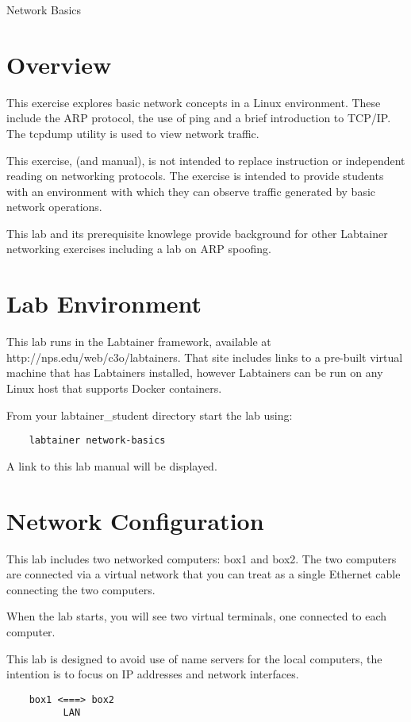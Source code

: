 


\begin{center}
{\LARGE Network Basics}
\vspace{0.1in}\\
\end{center}

\section{Overview}
This exercise explores basic network concepts 
in a Linux environment.  These include the ARP protocol,
the use of ping and a brief introduction to TCP/IP.  The tcpdump utility is
used to view network traffic.

This exercise, (and manual), is not intended to replace instruction
or independent reading on networking protocols.
The exercise is intended to provide
students with an environment with which they can observe 
traffic generated by basic network operations.

This lab and its prerequisite knowlege provide background for other Labtainer networking exercises 
including a lab on ARP spoofing.

\section{Lab Environment}
This lab runs in the Labtainer framework,
available at http://nps.edu/web/c3o/labtainers.
That site includes links to a pre-built virtual machine
that has Labtainers installed, however Labtainers can
be run on any Linux host that supports Docker containers.

From your labtainer_student directory start the lab using:
\begin{verbatim}
    labtainer network-basics
\end{verbatim}
\noindent A link to this lab manual will be displayed.  

\section{Network Configuration}
This lab includes two networked computers: box1 and box2. The two computers
are connected via a virtual network that you can treat as a single Ethernet
cable connecting the two computers. 
 
When the lab starts, you will see two virtual terminals, one connected to each
computer.  

This lab is designed to avoid use of name servers for the local computers, the intention is to focus
on IP addresses and network interfaces.
\begin{verbatim}
    box1 <===> box2
          LAN
\end{verbatim}

